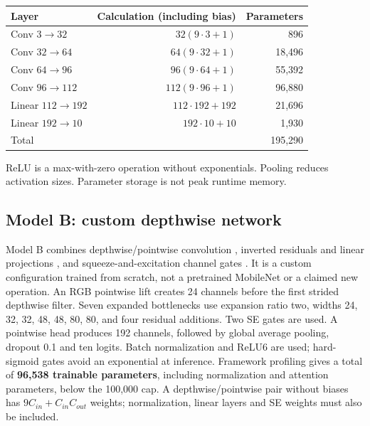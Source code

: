 \documentclass[11pt,a4paper]{article}
\begin{document}
\begin{center}\begin{tabular}{lrr}
\toprule Layer & Calculation (including bias) & Parameters \\
\midrule
Conv $3\rightarrow32$ & $32(9\cdot3+1)$ & 896 \\
Conv $32\rightarrow64$ & $64(9\cdot32+1)$ & 18,496 \\
Conv $64\rightarrow96$ & $96(9\cdot64+1)$ & 55,392 \\
Conv $96\rightarrow112$ & $112(9\cdot96+1)$ & 96,880 \\
Linear $112\rightarrow192$ & $112\cdot192+192$ & 21,696 \\
Linear $192\rightarrow10$ & $192\cdot10+10$ & 1,930 \\
\midrule Total & & 195,290 \\
\bottomrule\end{tabular}\end{center}
ReLU is a max-with-zero operation without exponentials. Pooling reduces activation sizes. Parameter storage is not peak runtime memory.

\subsection{Model B: custom depthwise network}
Model B combines depthwise/pointwise convolution \cite{mobilenet}, inverted residuals and linear projections \cite{sandler}, and squeeze-and-excitation channel gates \cite{hu}. It is a custom configuration trained from scratch, not a pretrained MobileNet or a claimed new operation. An RGB pointwise lift creates 24 channels before the first strided depthwise filter. Seven expanded bottlenecks use expansion ratio two, widths 24, 32, 32, 48, 48, 80, 80, and four residual additions. Two SE gates are used. A pointwise head produces 192 channels, followed by global average pooling, dropout 0.1 and ten logits. Batch normalization and ReLU6 are used; hard-sigmoid gates avoid an exponential at inference.
Framework profiling gives a total of \textbf{96,538 trainable parameters}, including normalization and attention parameters, below the 100,000 cap. A depthwise/pointwise pair without biases has $9C_{in}+C_{in}C_{out}$ weights; normalization, linear layers and SE weights must also be included.
\end{document}
